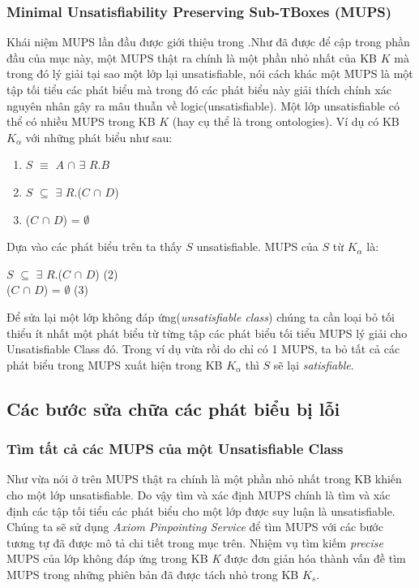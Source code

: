 		\subsubsection{Minimal Unsatisfiability Preserving Sub-TBoxes (MUPS)}
		Khái niệm MUPS lần đầu được giới thiệu trong \cite{mups}.Như đã được để cập trong phần đầu của mục này, một MUPS thật ra chính là một phần nhỏ nhất của KB $K$ mà trong đó lý giải tại sao một lớp lại unsatisfiable, nói cách khác một MUPS là một tập tối tiểu các phát biểu mà trong đó các phát biểu này giải thích chính xác nguyên nhân gây ra mâu thuẫn về logic(unsatisfiable). Một lớp unsatisfiable có thể có nhiều MUPS trong KB $K$ (hay cụ thể là trong ontologies). Ví dụ có KB $K_{\alpha}$ với những phát biểu như sau:
		\begin{enumerate}
			\item $S$ $\equiv$ $A$ $\cap$ $\exists$ $R.B$
			\item $S$ $\subseteq$ $\exists$ $R$.($C$ $\cap$ $D$) 
			\item ($C$ $\cap$ $D$) = $\emptyset$ 
		\end{enumerate}
		Dựa vào các phát biểu trên ta thấy $S$ unsatisfiable. MUPS của $S$ từ $K_{\alpha}$ là:
		\begin{center}
			$S$ $\subseteq$ $\exists$ $R$.($C$ $\cap$ $D$) (2)
			\\
			($C$ $\cap$ $D$) = $\emptyset$ (3)
		\end{center}
		Để sửa lại một lớp không đáp ứng(\textit{unsatisfiable class}) chúng ta cần loại bỏ tối thiểu ít nhất một phát biểu từ từng tập các phát biểu tối tiểu MUPS lý giải cho Unsatisfiable Class đó. Trong ví dụ vừa rồi do chỉ có 1 MUPS, ta bỏ tất cả các phát biểu trong MUPS xuất hiện trong KB $K_{\alpha}$ thì $S$ sẽ lại \textit{satisfiable}.
		\subsection{Các bước sửa chữa các phát biểu bị lỗi}
		\subsubsection{Tìm tất cả các MUPS của một Unsatisfiable Class}
		Như vừa nói ở trên MUPS thật ra chính là một phần nhỏ nhất trong KB khiến cho một lớp unsatisfiable. Do vậy tìm và xác định MUPS chính là tìm và xác định các tập tối tiểu các phát biểu cho một lớp được suy luận là  unsatisfiable. Chúng ta sẽ sử dụng \textit{Axiom Pinpointing Service}\cite{axiomPinpoint} để tìm MUPS với các bước tương tự đã được mô tả chi tiết trong mục trên. Nhiệm vụ tìm kiếm \textit{precise} MUPS của lớp không đáp ứng trong KB \textit{K} được đơn giản hóa thành vấn đề tìm MUPS trong những phiên bản đã được tách nhỏ trong KB $K_{s}$.
